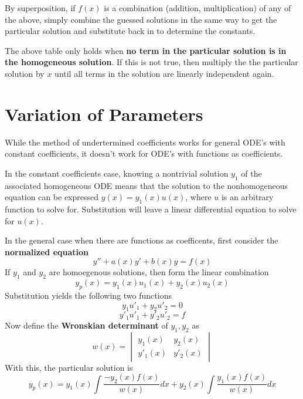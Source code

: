 \documentclass[11pt]{article}
\begin{document}
		By superposition, if $f(x)$ is a combination (addition, multiplication) of any of the above, simply combine the guessed solutions in the same way to get the particular solution and substitute back in to determine the constants.
		
		The above table only holds when \textbf{no term in the particular solution is in the homogeneous solution}. If this is not true, then multiply the the particular solution by $x$ until all terms in the solution are linearly independent again.
		
\section{Variation of Parameters}
	While the method of undertermined coefficients works for general ODE's with constant coefficients, it doesn't work for ODE's with functions as coefficients.
	
	In the constant coefficients case, knowing a nontrivial solution $y_1$ of the associated homogeneous ODE means that the solution to the nonhomogeneous equation can be expressed $y(x) = y_1(x)u(x)$, where $u$ is an arbitrary function to solve for. Substitution will leave a linear differential equation to solve for $u(x)$.
	
	In the general case when there are functions as coefficents, first consider the \textbf{normalized equation}
	\begin{equation}
		y'' + a(x)y' + b(x)y = f(x)
	\end{equation}
	If $y_1$ and $y_2$ are homoegenous solutions, then form the linear combination
	\begin{equation}
		y_p(x) = y_1(x)u_1(x) + y_2(x)u_2(x)
	\end{equation}
	Substitution yields the following two functions
	\begin{equation}
		y_1u'_1 + y_2u'_2 = 0
	\end{equation}
	\begin{equation}
		y'_1u'_1 + y'_2u'_2 = f
	\end{equation}
	Now define the \textbf{Wronskian determinant} of $y_1, y_2$ as
	\begin{equation}
	w(x) = 
	\begin{vmatrix}
		y_1(x) & y_2(x)\\
		y'_1(x) & y'_2(x)
	\end{vmatrix}
	\end{equation}
	With this, the particular solution is
	\begin{equation}
		y_p(x) = y_1(x) \int\frac{-y_2(x) f(x)}{w(x)}dx + y_2(x)\int\frac{y_1(x) f(x)}{w(x)}dx
	\end{equation}
	
\end{document}
